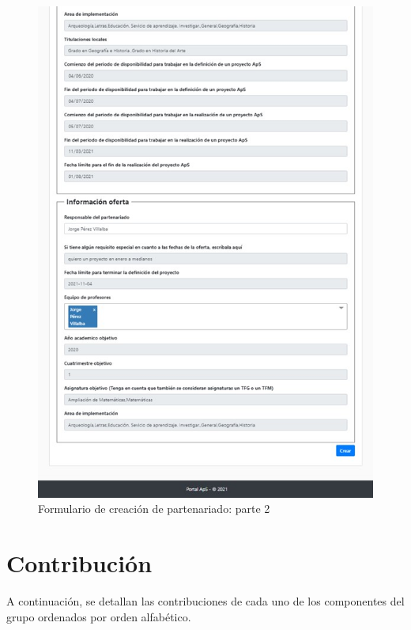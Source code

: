 \documentclass[11pt]{book}
\begin{document}
 \begin{figure}[t]
 	\centering
 	\includegraphics[scale=0.9]{partenariado2}
 	\caption{Formulario de creación de partenariado: parte 2}
 \end{figure}
\chapter{Contribución}
A continuación, se detallan las contribuciones de cada uno de los componentes del grupo ordenados por orden alfabético.
\end{document}
